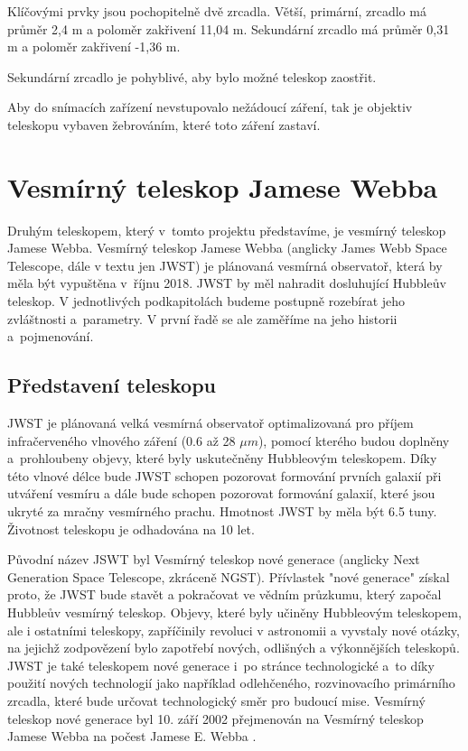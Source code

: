 \documentclass[a4paper,11pt]{article}
\begin{document}
Klíčovými prvky jsou pochopitelně dvě zrcadla. Větší, primární, zrcadlo má průměr 2,4 m a poloměr zakřivení 11,04 m. Sekundární zrcadlo má průměr 0,31 m a poloměr zakřivení -1,36 m.

Sekundární zrcadlo je pohyblivé, aby bylo možné teleskop zaostřit.

Aby do snímacích zařízení nevstupovalo nežádoucí záření, tak je objektiv teleskopu vybaven žebrováním, které toto záření zastaví.

\newpage

\section{Vesmírný teleskop Jamese Webba}

Druhým teleskopem, který v~tomto projektu představíme, je vesmírný teleskop Jamese Webba. Vesmírný teleskop Jamese Webba (anglicky James Webb Space Telescope, dále v textu jen JWST) je plánovaná vesmírná observatoř, která by měla být vypuštěna v~říjnu 2018. JWST by měl nahradit dosluhující Hubbleův teleskop. V jednotlivých podkapitolách budeme postupně rozebírat jeho zvláštnosti a~parametry. V první řadě se ale zaměříme na jeho historii a~pojmenování.

\subsection{Představení teleskopu} 
JWST je plánovaná velká vesmírná observatoř optimalizovaná pro příjem infračerveného vlnového záření (0.6 až 28 $\mu m$), pomocí kterého budou doplněny a~prohloubeny objevy, které byly uskutečněny Hubbleovým teleskopem.
Díky této vlnové délce bude JWST schopen pozorovat formování prvních galaxií při utváření vesmíru a dále bude schopen pozorovat formování galaxií, které jsou ukryté za mračny vesmírného prachu. Hmotnost JWST by měla být 6.5 tuny. Životnost teleskopu je odhadována na 10 let.

Původní název JSWT byl Vesmírný teleskop nové generace (anglicky Next Generation Space Telescope, zkráceně NGST). Přívlastek "nové generace" získal proto, že JWST bude stavět a pokračovat ve vědním průzku\-mu, který započal Hubbleův vesmírný teleskop. Objevy, které byly učiněny Hubbleovým teleskopem, ale i ostatními teleskopy, zapříčinily revoluci v astronomii a vyvstaly nové otázky, na jejichž zodpovězení bylo zapotřebí nových, odlišných a výkonnějších teleskopů. 
JWST je také teleskopem nové generace i~po stránce technologické a~to díky použití nových technologií jako například odlehčeného, rozvinovacího primárního zrcadla, které bude určovat technologický směr pro budoucí mise.
Vesmírný teleskop nové generace byl 10. září 2002 přejmenován na Vesmírný teleskop Jamese Webba na počest Jamese E. Webba \cite{nasaFAQ}.
 
\end{document}
